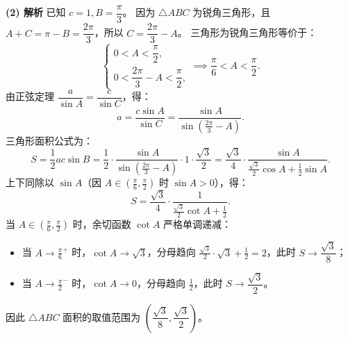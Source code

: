 \begin{answer}
\textbf{(2) 解析}
已知 $c = 1, B = \dfrac{\pi}{3}$。
因为 $\triangle ABC$ 为锐角三角形，且 $A + C = \pi - B = \dfrac{2\pi}{3}$，所以 $C = \dfrac{2\pi}{3} - A$。
三角形为锐角三角形等价于：
\nopagebreak[4]
\[\begin{cases} 0 < A < \dfrac{\pi}{2}, \\ 0 < \dfrac{2\pi}{3} - A < \dfrac{\pi}{2}, \end{cases} \implies \frac{\pi}{6} < A < \frac{\pi}{2}.\]
由正弦定理 $\dfrac{a}{\sin A} = \dfrac{c}{\sin C}$，得：
\nopagebreak[4]
\[a = \frac{c\sin A}{\sin C} = \frac{\sin A}{\sin\left(\frac{2\pi}{3} - A\right)}.\]
三角形面积公式为：
\nopagebreak[4]
\[S = \frac{1}{2}ac\sin B = \frac{1}{2} \cdot \frac{\sin A}{\sin\left(\frac{2\pi}{3} - A\right)} \cdot 1 \cdot \frac{\sqrt{3}}{2} = \frac{\sqrt{3}}{4} \cdot \frac{\sin A}{\frac{\sqrt{3}}{2}\cos A + \frac{1}{2}\sin A}.\]
上下同除以 $\sin A$（因 $A \in \left(\frac{\pi}{6}, \frac{\pi}{2}\right)$ 时 $\sin A > 0$），得：
\nopagebreak[4]
\[S = \frac{\sqrt{3}}{4} \cdot \frac{1}{\frac{\sqrt{3}}{2}\cot A + \frac{1}{2}}.\]
当 $A \in \left(\frac{\pi}{6}, \frac{\pi}{2}\right)$ 时，余切函数 $\cot A$ 严格单调递减：
\begin{itemize}
\item 当 $A \to \frac{\pi}{6}^+$ 时，$\cot A \to \sqrt{3}$，分母趋向 $\frac{\sqrt{3}}{2} \cdot \sqrt{3} + \frac{1}{2} = 2$，此时 $S \to \dfrac{\sqrt{3}}{8}$；
\item 当 $A \to \frac{\pi}{2}^-$ 时，$\cot A \to 0$，分母趋向 $\frac{1}{2}$，此时 $S \to \dfrac{\sqrt{3}}{2}$。
\end{itemize}
因此 $\triangle ABC$ 面积的取值范围为 $\left(\dfrac{\sqrt{3}}{8}, \dfrac{\sqrt{3}}{2}\right)$。



\end{answer}
